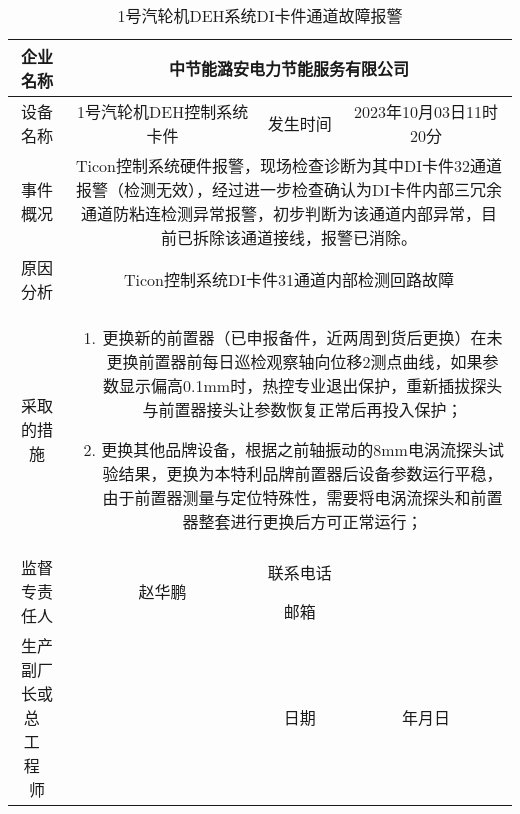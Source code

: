\begin{table}[htbp]
	\centering
	\caption{1号汽轮机DEH系统DI卡件通道故障报警}\label{sec}
\begin{tabular}{|c|c|c|c|}
\hline
	企业名称 & \multicolumn{3}{|c|}{中节能潞安电力节能服务有限公司}\tabularnewline
\hline
	设备名称&1号汽轮机DEH控制系统卡件&发生时间&2023年10月03日11时20分\tabularnewline  
\hline
	事件概况&\multicolumn{3}{|c|}{
		\begin{minipage}[c][25ex][c]{35em}
		Ticon控制系统硬件报警，现场检查诊断为其中DI卡件32通道报警（检测无效），经过进一步检查确认为DI卡件内部三冗余通道防粘连检测异常报警，初步判断为该通道内部异常，目前已拆除该通道接线，报警已消除。
		\end{minipage}
	}\tabularnewline  
\hline
	原因分析&\multicolumn{3}{|c|}{
\begin{minipage}[c][30ex][c]{35em}
		Ticon控制系统DI卡件31通道内部检测回路故障
		\end{minipage}
}\tabularnewline  
\hline
	采取的措施&\multicolumn{3}{|c|}{
\begin{minipage}[c][50ex][c]{35em}
			\begin{enumerate}
				\item 更换新的前置器（已申报备件，近两周到货后更换）在未更换前置器前每日巡检观察轴向位移2测点曲线，如果参数显示偏高0.1mm时，热控专业退出保护，重新插拔探头与前置器接头让参数恢复正常后再投入保护；
				\item 更换其他品牌设备，根据之前轴振动的8mm电涡流探头试验结果，更换为本特利品牌前置器后设备参数运行平稳，由于前置器测量与定位特殊性，需要将电涡流探头和前置器整套进行更换后方可正常运行；
			\end{enumerate}
		\end{minipage}
}\tabularnewline  
\hline
	\multirow{2}{*}{监督专责任人} & \multirow{2}{*}{赵华鹏}&联系电话&\tabularnewline  
	\cline{3-4}&&邮箱&\tabularnewline
\hline
	\parbox[c][8ex][c]{6em}{生产副厂长或\\总\,\,\,\,工\,\,\,\,程\,\,\,\,师}&&日期&年月日\tabularnewline  
\hline
\end{tabular}
\end{table}